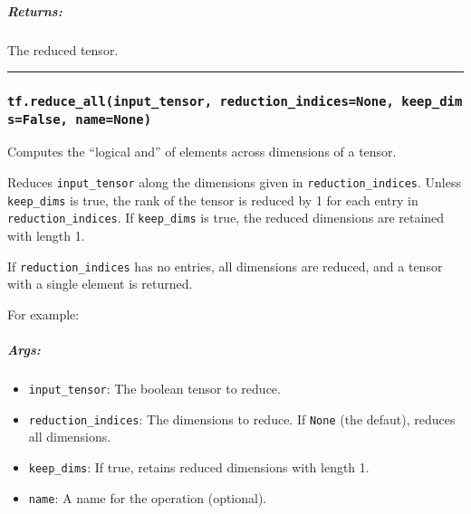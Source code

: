 \subparagraph{Returns: }\label{returns-42}

The reduced tensor.

\begin{center}\rule{0.5\linewidth}{\linethickness}\end{center}

\subsubsection{\texorpdfstring{\texttt{tf.reduce\_all(input\_tensor,\ reduction\_indices=None,\ keep\_dims=False,\ name=None)}
}{tf.reduce\_all(input\_tensor, reduction\_indices=None, keep\_dims=False, name=None) }}\label{tf.reduceux5fallinputux5ftensor-reductionux5findicesnone-keepux5fdimsfalse-namenone}

Computes the ``logical and'' of elements across dimensions of a tensor.

Reduces \texttt{input\_tensor} along the dimensions given in
\texttt{reduction\_indices}. Unless \texttt{keep\_dims} is true, the
rank of the tensor is reduced by 1 for each entry in
\texttt{reduction\_indices}. If \texttt{keep\_dims} is true, the reduced
dimensions are retained with length 1.

If \texttt{reduction\_indices} has no entries, all dimensions are
reduced, and a tensor with a single element is returned.

For example:

\begin{Shaded}
\begin{Highlighting}[]
\CommentTok{#         [False, False]]}
\OperatorTok{==>} 
\NormalTok{) }\OperatorTok{==>} \NormalTok{[}\NormalTok{, }\NormalTok{]}
\NormalTok{) }\OperatorTok{==>} \NormalTok{[}\NormalTok{, }\NormalTok{]}
\end{Highlighting}
\end{Shaded}

\subparagraph{Args: }\label{args-43}

\begin{itemize}
\tightlist
\item
  \texttt{input\_tensor}: The boolean tensor to reduce.
\item
  \texttt{reduction\_indices}: The dimensions to reduce. If
  \texttt{None} (the defaut), reduces all dimensions.
\item
  \texttt{keep\_dims}: If true, retains reduced dimensions with length
  1.
\item
  \texttt{name}: A name for the operation (optional).
\end{itemize}

